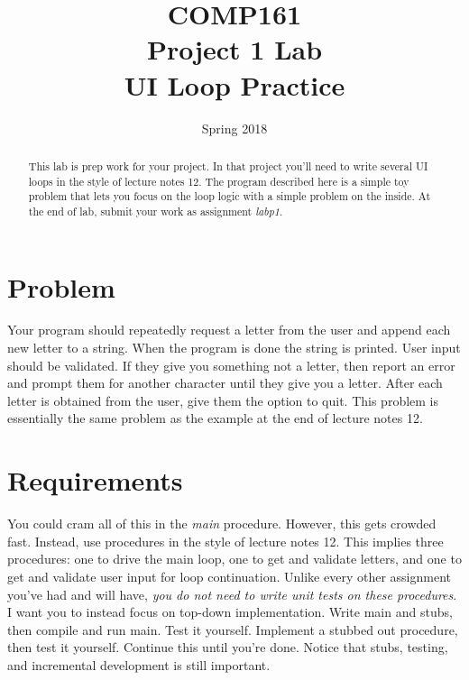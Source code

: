 \documentclass[]{tufte-handout}
\title{COMP161 \\ Project 1 Lab \\ UI Loop Practice}
\author{}
\date{Spring 2018}
\begin{document}
\maketitle

\begin{abstract}
This lab is prep work for your project. In that project you'll need to write several UI loops in the style of lecture notes 12. The program described here is a simple toy problem that lets you focus on the loop logic with a simple problem on the inside. At the end of lab, submit your work as assignment \textit{labp1}.
\end{abstract}

\section{Problem}

Your program should repeatedly request a letter from the user and append each new letter to a string. When the program is done the string is printed. User input should be validated. If they give you something not a letter, then report an error and prompt them for another character until they give you a letter.  After each letter is obtained from the user, give them the option to quit. This problem is essentially the same problem as the example at the end of lecture notes 12.

\section{Requirements}

You could cram all of this in the \textit{main} procedure. However, this gets crowded fast. Instead, use procedures in the style of lecture notes 12. This implies three procedures: one to drive the main loop, one to get and validate letters, and one to get and validate user input for loop continuation. Unlike every other assignment you've had and will have, \textit{you do not need to write unit tests on these procedures}.  I want you to instead focus on top-down implementation. Write main and stubs, then compile and run main. Test it yourself. Implement a stubbed out procedure, then test it yourself. Continue this until you're done. Notice that stubs, testing, and incremental development is still important.
\end{document}
